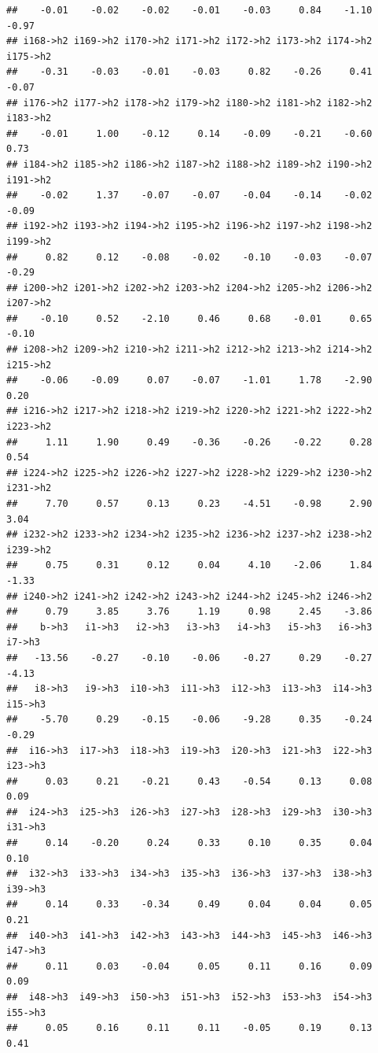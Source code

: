 \documentclass[
]{article}
\begin{document}
\begin{verbatim}
##    -0.01    -0.02    -0.02    -0.01    -0.03     0.84    -1.10    -0.97 
## i168->h2 i169->h2 i170->h2 i171->h2 i172->h2 i173->h2 i174->h2 i175->h2 
##    -0.31    -0.03    -0.01    -0.03     0.82    -0.26     0.41    -0.07 
## i176->h2 i177->h2 i178->h2 i179->h2 i180->h2 i181->h2 i182->h2 i183->h2 
##    -0.01     1.00    -0.12     0.14    -0.09    -0.21    -0.60     0.73 
## i184->h2 i185->h2 i186->h2 i187->h2 i188->h2 i189->h2 i190->h2 i191->h2 
##    -0.02     1.37    -0.07    -0.07    -0.04    -0.14    -0.02    -0.09 
## i192->h2 i193->h2 i194->h2 i195->h2 i196->h2 i197->h2 i198->h2 i199->h2 
##     0.82     0.12    -0.08    -0.02    -0.10    -0.03    -0.07    -0.29 
## i200->h2 i201->h2 i202->h2 i203->h2 i204->h2 i205->h2 i206->h2 i207->h2 
##    -0.10     0.52    -2.10     0.46     0.68    -0.01     0.65    -0.10 
## i208->h2 i209->h2 i210->h2 i211->h2 i212->h2 i213->h2 i214->h2 i215->h2 
##    -0.06    -0.09     0.07    -0.07    -1.01     1.78    -2.90     0.20 
## i216->h2 i217->h2 i218->h2 i219->h2 i220->h2 i221->h2 i222->h2 i223->h2 
##     1.11     1.90     0.49    -0.36    -0.26    -0.22     0.28     0.54 
## i224->h2 i225->h2 i226->h2 i227->h2 i228->h2 i229->h2 i230->h2 i231->h2 
##     7.70     0.57     0.13     0.23    -4.51    -0.98     2.90     3.04 
## i232->h2 i233->h2 i234->h2 i235->h2 i236->h2 i237->h2 i238->h2 i239->h2 
##     0.75     0.31     0.12     0.04     4.10    -2.06     1.84    -1.33 
## i240->h2 i241->h2 i242->h2 i243->h2 i244->h2 i245->h2 i246->h2 
##     0.79     3.85     3.76     1.19     0.98     2.45    -3.86 
##    b->h3   i1->h3   i2->h3   i3->h3   i4->h3   i5->h3   i6->h3   i7->h3 
##   -13.56    -0.27    -0.10    -0.06    -0.27     0.29    -0.27    -4.13 
##   i8->h3   i9->h3  i10->h3  i11->h3  i12->h3  i13->h3  i14->h3  i15->h3 
##    -5.70     0.29    -0.15    -0.06    -9.28     0.35    -0.24    -0.29 
##  i16->h3  i17->h3  i18->h3  i19->h3  i20->h3  i21->h3  i22->h3  i23->h3 
##     0.03     0.21    -0.21     0.43    -0.54     0.13     0.08     0.09 
##  i24->h3  i25->h3  i26->h3  i27->h3  i28->h3  i29->h3  i30->h3  i31->h3 
##     0.14    -0.20     0.24     0.33     0.10     0.35     0.04     0.10 
##  i32->h3  i33->h3  i34->h3  i35->h3  i36->h3  i37->h3  i38->h3  i39->h3 
##     0.14     0.33    -0.34     0.49     0.04     0.04     0.05     0.21 
##  i40->h3  i41->h3  i42->h3  i43->h3  i44->h3  i45->h3  i46->h3  i47->h3 
##     0.11     0.03    -0.04     0.05     0.11     0.16     0.09     0.09 
##  i48->h3  i49->h3  i50->h3  i51->h3  i52->h3  i53->h3  i54->h3  i55->h3 
##     0.05     0.16     0.11     0.11    -0.05     0.19     0.13     0.41 

\end{verbatim}
\end{document}
